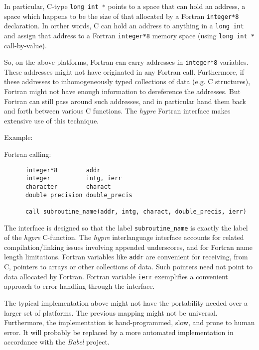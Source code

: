 \vspace{0.2in}

In particular, C-type
\verb+long int *+ points to a space that can hold an address, a space
which happens to be the size of that allocated by a Fortran
\verb+integer*8+ declaration.
In orther words, C can hold an address to anything in a \verb+long int+ and
assign that address to a Fortran \verb+integer*8+ memory space
(using \verb+long int *+ call-by-value).

So, on the above platforms, Fortran can carry addresses in \verb+integer*8+
variables.  These addresses might not have originated in any Fortran call.
Furthermore, if these addresses to inhomogeneously typed collections of data
(e.g. C structures), Fortran might not have enough information to dereference
the addresses.  But Fortran can still pass around such addresses, and in
particular hand them back and forth between various C functions.  The
{\slshape hypre} Fortran interface makes extensive use of this technique.

\vspace{0.1in}

\noindent Example:

\vspace{0.1in}

  Fortran calling:
\begin{verbatim}
      integer*8        addr
      integer          intg, ierr
      character        charact
      double precision double_precis

      call subroutine_name(addr, intg, charact, double_precis, ierr)
\end{verbatim}

The interface is designed so that the label \verb+subroutine_name+ is exactly
the label of the {\slshape hypre} C-function.  The {\slshape hypre}
interlanguage interface
accounts for related compilation/linking issues involving appended
underscores, and for Fortran name length limitations.
Fortran variables like \verb+addr+
are convenient for receiving, from C, pointers to arrays or other
collections of data.  Such pointers need not point to data allocated by
Fortran.  Fortran variable \verb+ierr+ exemplifies a convenient approach
to error handling through the interface.

The typical implementation above might not have the portability needed
over a larger set of platforms.  The previous mapping might
not be universal.  Furthermore,
the implementation is hand-programmed, slow, and prone to human error.
It will probably be replaced by a more automated implementation in accordance
with the {\slshape Babel} project. 

